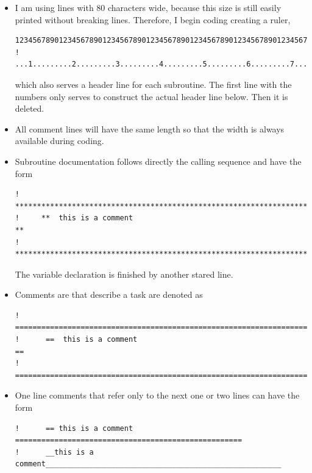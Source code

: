 \documentclass[a4paper,10pt]{report}
\begin{document}
\begin{itemize}
\item   I am using lines with 80 characters wide, because this size is still
  easily printed without breaking lines. Therefore, I begin coding
  creating a ruler, 
{\small
\begin{verbatim}
12345678901234567890123456789012345678901234567890123456789012345678901234567890
!     ...1.........2.........3.........4.........5.........6.........7.........8
\end{verbatim}} 
  which also serves a header line for each
  subroutine.  The first line with the numbers only serves to construct
  the actual header line below. Then it is deleted.

\item All comment lines will have the same length so that the width is always 
available during coding.

\item Subroutine documentation follows directly the calling sequence and have the form
{\small
\begin{verbatim}
!     **************************************************************************
!     **  this is a comment                                                   **
!     **************************************************************************
\end{verbatim}}
The variable declaration is finished by another stared line.

\item Comments are that describe a task are denoted as
{\small
\begin{verbatim}
!      =========================================================================
!      ==  this is a comment                                                  ==
!      =========================================================================
\end{verbatim}}

\item One line comments that refer only to the next one or two lines
can have the form
{\small
\begin{verbatim}
!      == this is a comment ====================================================
!      __this is a comment______________________________________________________
\end{verbatim}}
\end{itemize}
%
\end{document}
